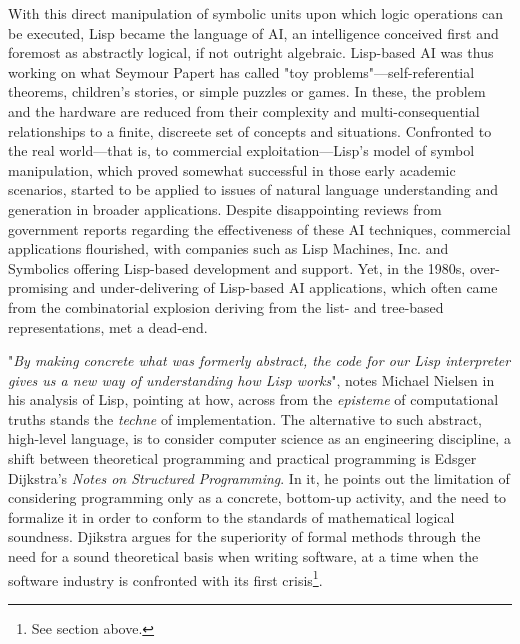 With this direct manipulation of symbolic units upon which logic operations can be executed, Lisp became the language of AI, an intelligence conceived first and foremost as abstractly logical, if not outright algebraic. Lisp-based AI was thus working on what Seymour Papert has called "toy problems"—self-referential theorems, children's stories, or simple puzzles or games. In these, the problem and the hardware are reduced from their complexity and multi-consequential relationships to a finite, discreete set of concepts and situations. Confronted to the real world—that is, to commercial exploitation—Lisp's model of symbol manipulation, which proved somewhat successful in those early academic scenarios, started to be applied to issues of natural language understanding and generation in broader applications. Despite disappointing reviews from government reports regarding the effectiveness of these AI techniques, commercial applications flourished, with companies such as Lisp Machines, Inc. and Symbolics offering Lisp-based development and support. Yet, in the 1980s, over-promising and under-delivering of Lisp-based AI applications, which often came from the combinatorial explosion deriving from the list- and tree-based representations, met a dead-end.

\vspace*{1\baselineskip}

"\emph{By making concrete what was formerly abstract, the code for our Lisp interpreter gives us a new way of understanding how Lisp works}", notes Michael Nielsen in his analysis of Lisp, pointing at how, across from the \emph{episteme} of computational truths stands the \emph{techne} of implementation\cite{nielsen_lisp_2012}. The alternative to such abstract, high-level language, is to consider computer science as an engineering discipline, a shift between theoretical programming and practical programming is Edsger Dijkstra's \emph{Notes on Structured Programming}. In it, he points out the limitation of considering programming only as a concrete, bottom-up activity, and the need to formalize it in order to conform to the standards of mathematical logical soundness. Djikstra argues for the superiority of formal methods through the need for a sound theoretical basis when writing software, at a time when the software industry is confronted with its first crisis\footnote{See section above.}.

